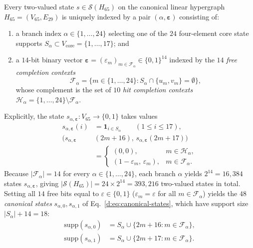 \documentclass[aps,pra,reprint,superscriptaddress,longbibliography,nofootinbib,floatfix,10pt]{revtex4-2}
\theoremstyle{definition}
\begin{document}
Every two-valued state $s\in\mathcal{S}(H_{65})$ on the canonical linear hypergraph $H_{65}=(V_{65},E_{29})$ is uniquely indexed by a pair $(\alpha,\bm{\varepsilon})$ consisting of:
\begin{enumerate}
\item a branch index $\alpha\in\{1,\ldots,24\}$ selecting one of the $24$ four-element core state supports $S_\alpha\subset V_{\mathrm{core}}=\{1,\ldots,17\}$; and
\item a $14$-bit binary vector $\bm{\varepsilon}=(\varepsilon_m)_{m\in \mathcal{F}_\alpha}\in\{0,1\}^{14}$ indexed by the $14$ \emph{free completion contexts}
\begin{equation*}
\mathcal{F}_\alpha=\bigl\{m\in\{1,\ldots,24\} : S_\alpha\cap\{u_m,v_m\}=\emptyset\bigr\},
\end{equation*}
whose complement is the set of $10$ \emph{hit completion contexts} $\mathcal{H}_\alpha=\{1,\ldots,24\}\setminus \mathcal{F}_\alpha$.
\end{enumerate}
Explicitly, the state $s_{\alpha,\bm{\varepsilon}}:V_{65}\to\{0,1\}$ takes values
\begin{equation}\label{d:eq:full-state-param}
\begin{aligned}
s_{\alpha,\bm{\varepsilon}}(i)&=\mathbf{1}_{i\in S_\alpha}\qquad(1\le i\le 17),\\
\bigl(s_{\alpha,\bm{\varepsilon}}&(2m+16),\,s_{\alpha,\bm{\varepsilon}}(2m+17)\bigr)\\
&=\begin{cases}
(0,0), & m\in \mathcal{H}_\alpha,\\
(1-\varepsilon_m,\,\varepsilon_m), & m\in \mathcal{F}_\alpha.
\end{cases}
\end{aligned}
\end{equation}
Because $|\mathcal{F}_\alpha|=14$ for every $\alpha\in\{1,\ldots,24\}$, each branch $\alpha$ yields $2^{14}=16{,}384$ states $s_{\alpha,\bm{\varepsilon}}$, giving $|\mathcal{S}(H_{65})|=24\times 2^{14}=393{,}216$ two-valued states in total. Setting all $14$ free bits equal to $\varepsilon\in\{0,1\}$ ($\varepsilon_m=\varepsilon$ for all $m\in \mathcal{F}_\alpha$) yields the $48$ \emph{canonical states} $s_{\alpha,0},s_{\alpha,1}$ of Eq.~\eqref{d:eq:canonical-states}, which have support size $|S_\alpha|+14=18$:
\begin{equation}\label{d:eq:canonical-state-supports}
\begin{aligned}
\mathrm{supp}(s_{\alpha,0}) &= S_\alpha \cup \bigl\{2m+16 : m\in \mathcal{F}_\alpha\bigr\},\\
\mathrm{supp}(s_{\alpha,1}) &= S_\alpha \cup \bigl\{2m+17 : m\in \mathcal{F}_\alpha\bigr\}.
\end{aligned}
\end{equation}
\end{document}

